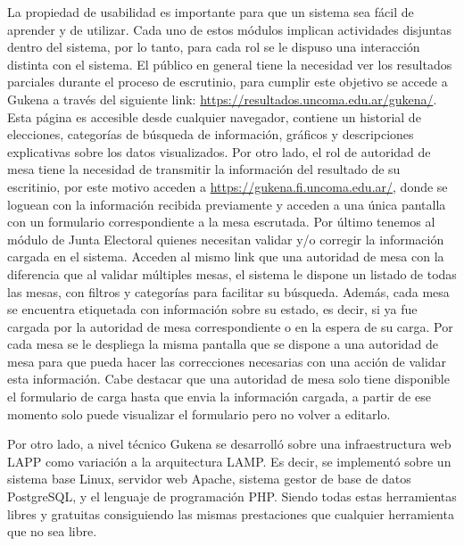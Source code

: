 La propiedad de usabilidad es importante para que un sistema sea fácil de aprender y de utilizar. Cada uno de estos módulos implican actividades disjuntas dentro del sistema, por lo tanto, para cada rol se le dispuso una interacción distinta con el sistema. \newline
El público en general tiene la necesidad ver los resultados parciales durante el proceso de escrutinio, para cumplir este objetivo se accede a Gukena a través del siguiente link:  \url{https://resultados.uncoma.edu.ar/gukena/}.
Esta página es accesible desde cualquier navegador, contiene un historial de elecciones, categorías de búsqueda de información, gráficos y descripciones explicativas sobre los datos visualizados. Por otro lado, el rol de autoridad de mesa tiene la necesidad de transmitir la información del resultado de su escritinio, por este motivo acceden a \url{https://gukena.fi.uncoma.edu.ar/},
donde se loguean con la información recibida previamente y acceden a una única pantalla con un formulario correspondiente a la mesa escrutada. Por último tenemos al módulo de Junta Electoral quienes necesitan validar y/o corregir la información cargada en el sistema. Acceden al mismo link que una autoridad de mesa con la diferencia que al validar múltiples mesas, el sistema le dispone un listado de todas las mesas, con filtros y categorías para facilitar su búsqueda. Además, cada mesa se encuentra etiquetada con información sobre su estado, es decir, si ya fue cargada por la autoridad de mesa correspondiente o en la espera de su carga. Por cada mesa se le despliega la misma pantalla que se dispone a una autoridad de mesa para que pueda hacer las correcciones necesarias con una acción de validar esta información. Cabe destacar que una autoridad de mesa solo tiene disponible el formulario de carga hasta que envia la información cargada, a partir de ese momento solo puede visualizar el formulario pero no volver a editarlo.\newline

Por otro lado, a nivel técnico Gukena se desarrolló sobre una infraestructura web LAPP como variación a la arquitectura LAMP. Es decir, se implementó sobre un sistema base Linux, servidor web Apache, sistema gestor de base de datos PostgreSQL, y el lenguaje de programación PHP. Siendo todas estas herramientas libres y gratuitas consiguiendo las mismas prestaciones que cualquier herramienta que no sea libre.

